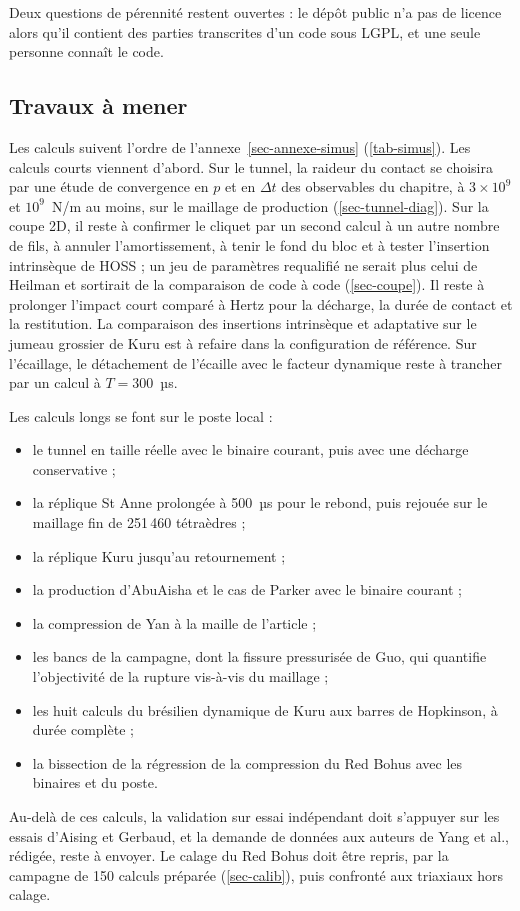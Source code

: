 Deux questions de pérennité restent ouvertes : le dépôt public n'a pas de licence alors qu'il contient des parties transcrites d'un code sous LGPL, et une seule personne connaît le code.

\subsection{Travaux à mener}

Les calculs suivent l'ordre de l'annexe~\ref{sec-annexe-simus} (\cref{tab-simus}). Les calculs courts viennent d'abord. Sur le tunnel, la raideur du contact se choisira par une étude de convergence en $p$ et en $\Delta t$ des observables du chapitre, à $3\times10^9$ et $10^9$~N/m au moins, sur le maillage de production (\cref{sec-tunnel-diag}). Sur la coupe 2D, il reste à confirmer le cliquet par un second calcul à un autre nombre de fils, à annuler l'amortissement, à tenir le fond du bloc et à tester l'insertion intrinsèque de HOSS ; un jeu de paramètres requalifié ne serait plus celui de Heilman et sortirait de la comparaison de code à code (\cref{sec-coupe}). Il reste à prolonger l'impact court comparé à Hertz pour la décharge, la durée de contact et la restitution. La comparaison des insertions intrinsèque et adaptative sur le jumeau grossier de Kuru est à refaire dans la configuration de référence. Sur l'écaillage, le détachement de l'écaille avec le facteur dynamique reste à trancher par un calcul à $T = 300$~µs.

Les calculs longs se font sur le poste local :
\begin{itemize}
\item le tunnel en taille réelle avec le binaire courant, puis avec une décharge conservative ;
\item la réplique St Anne prolongée à 500~µs pour le rebond, puis rejouée sur le maillage fin de 251\,460 tétraèdres ;
\item la réplique Kuru jusqu'au retournement ;
\item la production d'AbuAisha et le cas de Parker avec le binaire courant ;
\item la compression de Yan à la maille de l'article ;
\item les bancs de la campagne, dont la fissure pressurisée de Guo, qui quantifie l'objectivité de la rupture vis-à-vis du maillage ;
\item les huit calculs du brésilien dynamique de Kuru aux barres de Hopkinson, à durée complète ;
\item la bissection de la régression de la compression du Red Bohus avec les binaires  et  du poste.
\end{itemize}

Au-delà de ces calculs, la validation sur essai indépendant doit s'appuyer sur les essais d'Aising et Gerbaud, et la demande de données aux auteurs de Yang et al., rédigée, reste à envoyer. Le calage du Red Bohus doit être repris, par la campagne de 150 calculs préparée (\cref{sec-calib}), puis confronté aux triaxiaux hors calage.
